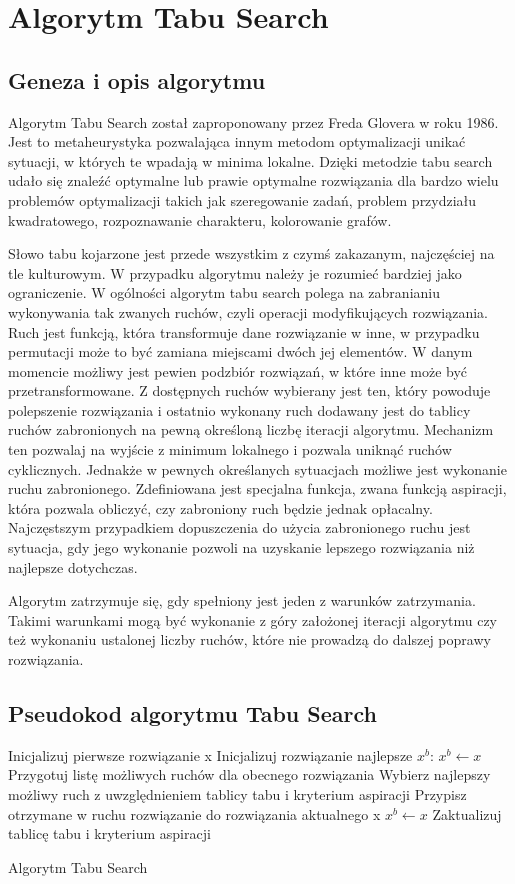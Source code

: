 \section{Algorytm Tabu Search}
\label{sec:TS}
\subsection{Geneza i opis algorytmu}
Algorytm Tabu Search został zaproponowany przez Freda Glovera w roku 1986. Jest to metaheurystyka pozwalająca innym metodom optymalizacji unikać sytuacji, w których te wpadają w minima lokalne. Dzięki metodzie tabu search udało się znaleźć optymalne lub prawie optymalne rozwiązania dla bardzo wielu problemów optymalizacji takich jak szeregowanie zadań, problem przydziału kwadratowego, rozpoznawanie charakteru, kolorowanie grafów.

Słowo tabu kojarzone jest przede wszystkim z czymś zakazanym, najczęściej na tle kulturowym. W przypadku algorytmu należy je rozumieć bardziej jako ograniczenie. W ogólności algorytm tabu search polega na zabranianiu wykonywania tak zwanych ruchów, czyli operacji modyfikujących rozwiązania. Ruch jest funkcją, która transformuje dane rozwiązanie w inne, w przypadku permutacji może to być zamiana miejscami dwóch jej elementów. W danym momencie możliwy jest pewien podzbiór rozwiązań, w które inne może być przetransformowane. Z dostępnych ruchów wybierany jest ten, który powoduje polepszenie rozwiązania i ostatnio wykonany ruch dodawany jest do tablicy ruchów zabronionych na pewną określoną liczbę iteracji algorytmu. Mechanizm ten pozwalaj na wyjście z minimum lokalnego i pozwala uniknąć ruchów cyklicznych. Jednakże w pewnych określanych sytuacjach możliwe jest wykonanie ruchu zabronionego. Zdefiniowana jest specjalna funkcja, zwana funkcją aspiracji, która pozwala obliczyć, czy zabroniony ruch będzie jednak opłacalny. Najczęstszym przypadkiem dopuszczenia do użycia zabronionego ruchu jest sytuacja, gdy jego wykonanie pozwoli na uzyskanie lepszego rozwiązania niż najlepsze dotychczas.

Algorytm zatrzymuje się, gdy spełniony jest jeden z warunków zatrzymania. Takimi warunkami mogą być wykonanie z góry założonej iteracji algorytmu czy też wykonaniu ustalonej liczby ruchów, które nie prowadzą do dalszej poprawy rozwiązania.

\subsection{Pseudokod algorytmu Tabu Search}
\begin{algorithm}[H]
	Inicjalizuj pierwsze rozwiązanie x\;
	Inicjalizuj rozwiązanie najlepsze $x^b$: $x^b \leftarrow x$\;
 	{
 		Przygotuj listę możliwych ruchów dla obecnego rozwiązania\;
 		Wybierz najlepszy możliwy ruch z uwzględnieniem tablicy tabu i kryterium aspiracji\;
 		Przypisz otrzymane w ruchu rozwiązanie do rozwiązania aktualnego x\;
 		{
 			$x^b \leftarrow x$
 		} 		
 		Zaktualizuj tablicę tabu i kryterium aspiracji\;		
 	}
 	\caption{Algorytm Tabu Search}
\end{algorithm}

